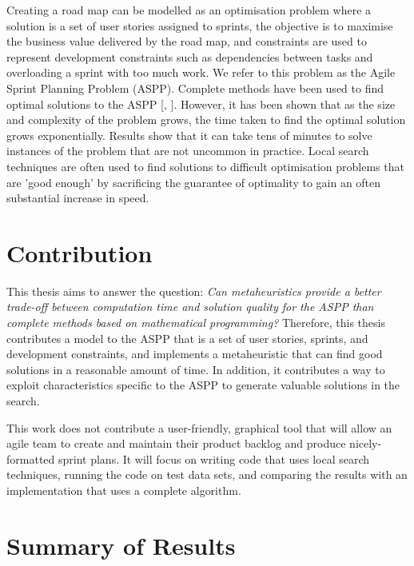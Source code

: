 Creating a road map can be modelled as an optimisation problem where a solution is a set of user stories assigned to sprints, the objective is to maximise the business value delivered by the road map, and constraints are used to represent development constraints such as dependencies between tasks and overloading a sprint with too much work. We refer to this problem as the Agile Sprint Planning Problem (ASPP). Complete methods have been used to find optimal solutions to the ASPP [\citet{golfarelli2012sprint}, \citet{golfarelli2013multi}]. However, it has been shown that as the size and complexity of the problem grows, the time taken to find the optimal solution grows exponentially. Results show that it can take tens of minutes to solve instances of the problem that are not uncommon in practice. Local search techniques are often used to find solutions to difficult optimisation problems that are 'good enough' by sacrificing the guarantee of optimality to gain an often substantial increase in speed.

\section{Contribution}

This thesis aims to answer the question: \emph{Can metaheuristics provide a better trade-off between computation time and solution quality for the ASPP than complete methods based on mathematical programming?} Therefore, this thesis contributes a model to the ASPP that is a set of user stories, sprints, and development constraints, and implements a metaheuristic that can find good solutions in a reasonable amount of time. In addition, it contributes a way to exploit characteristics specific to the ASPP to generate valuable solutions in the search.

This work does not contribute a user-friendly, graphical tool that will allow an agile team to create and maintain their product backlog and produce nicely-formatted sprint plans. It will focus on writing code that uses local search techniques, running the code on test data sets, and comparing the results with an implementation that uses a complete algorithm.

\section{Summary of Results}

